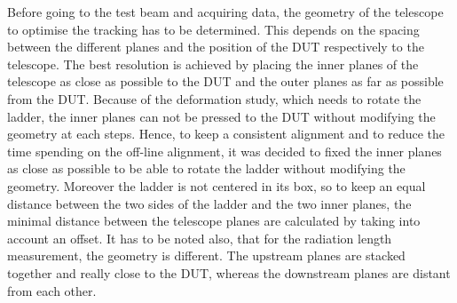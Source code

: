     Before going to the test beam and acquiring data, the geometry of the telescope to optimise the tracking has to be determined.
    This depends on the spacing between the different planes and the position of the \gls{DUT} respectively to the telescope.
    The best resolution is achieved by placing the inner planes of the telescope as close as possible to the \gls{DUT} and the outer planes as far as possible from the \gls{DUT}.
    Because of the deformation study, which needs to rotate the ladder, the inner planes can not be pressed to the \gls{DUT} without modifying the geometry at each steps.
    Hence, to keep a consistent alignment and to reduce the time spending on the off-line alignment, it was decided to fixed the inner planes as close as possible to be able to rotate the ladder without modifying the geometry.
    Moreover the ladder is not centered in its box, so to keep an equal distance between the two sides of the ladder and the two inner planes, the minimal distance between the telescope planes are calculated by taking into account an offset.
    It has to be noted also, that for the radiation length measurement, the geometry is different.
    The upstream planes are stacked together and really close to the \gls{DUT}, whereas the downstream planes are distant from each other.


